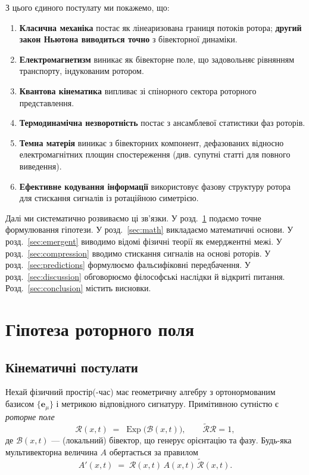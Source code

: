 \documentclass[11pt,a4paper]{article}
\newcommand{\e}{\mathbf{e}}
\newcommand{\rev}[1]{\widetilde{#1}}           %
\newcommand{\Exp}{\operatorname{Exp}}
\newcommand{\Rotor}{\mathcal{R}}
\newcommand{\Biv}{\mathcal{B}}
\theoremstyle{definition}
\theoremstyle{plain}
\theoremstyle{remark}
\begin{document}
З цього єдиного постулату ми покажемо, що:

\begin{enumerate}[leftmargin=*,itemsep=3pt]
  \item \textbf{Класична механіка} постає як лінеаризована границя потоків ротора; \textbf{другий закон Ньютона виводиться точно} з бівекторної динаміки.
  \item \textbf{Електромагнетизм} виникає як бівекторне поле, що задовольняє рівнянням транспорту, індукованим ротором.
  \item \textbf{Квантова кінематика} випливає зі спінорного сектора роторного представлення.
  \item \textbf{Термодинамічна незворотність} постає з ансамблевої статистики фаз роторів.
  \item \textbf{Темна матерія} виникає з бівекторних компонент, дефазованих відносно електромагнітних площин спостереження (див. супутні статті для повного виведення).
  \item \textbf{Ефективне кодування інформації} використовує фазову структуру ротора для стискання сигналів із ротаційною симетрією.
\end{enumerate}

Далі ми систематично розвиваємо ці зв’язки. У розд.~\ref{sec:hypothesis} подаємо точне формулювання гіпотези. У розд.~\ref{sec:math} викладаємо математичні основи. У розд.~\ref{sec:emergent} виводимо відомі фізичні теорії як емерджентні межі. У розд.~\ref{sec:compression} вводимо стискання сигналів на основі роторів. У розд.~\ref{sec:predictions} формулюємо фальсифіковні передбачення. У розд.~\ref{sec:discussion} обговорюємо філософські наслідки й відкриті питання. Розд.~\ref{sec:conclusion} містить висновки.

\vspace{1em}

\section{Гіпотеза роторного поля}\label{sec:hypothesis}

\subsection{Кінематичні постулати}

Нехай фізичний простір(-час) має геометричну алгебру з ортонормованим базисом $\{\e_\mu\}$ і метрикою відповідного сигнатуру. Примітивною сутністю є \emph{роторне поле}
\begin{equation}
  \Rotor(x,t) \;=\; \Exp\!\big(\Biv(x,t)\big),
  \qquad \rev{\Rotor}\Rotor = 1,
  \label{eq:rotor}
\end{equation}
де $\Biv(x,t)$ — (локальний) бівектор, що генерує орієнтацію та фазу. Будь-яка мультивекторна величина $A$ обертається за правилом
\begin{equation}
  A'(x,t) \;=\; \Rotor(x,t)\, A(x,t)\, \rev{\Rotor}(x,t).
\end{equation}
\end{document}
